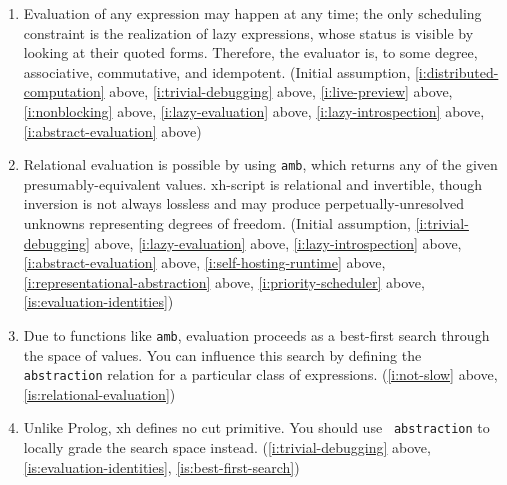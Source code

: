 \documentclass{report}
\begin{document}
\begin{enumerate}
\item{}\label{is:evaluation-identities}
  Evaluation of any expression may happen at any time; the only scheduling
  constraint is the realization of lazy expressions, whose status is
  visible by looking at their quoted forms. Therefore, the evaluator is, to
  some degree, associative, commutative, and idempotent.
    (Initial assumption,
     \ref{i:distributed-computation} above,
     \ref{i:trivial-debugging} above,
     \ref{i:live-preview} above,
     \ref{i:nonblocking} above,
     \ref{i:lazy-evaluation} above,
     \ref{i:lazy-introspection} above,
     \ref{i:abstract-evaluation} above)

\item{}\label{is:relational-evaluation}
  Relational evaluation is possible by using {\tt amb}, which returns any
  of the given presumably-equivalent values. xh-script is relational and
  invertible, though inversion is not always lossless and may produce
  perpetually-unresolved unknowns representing degrees of freedom.
    (Initial assumption,
     \ref{i:trivial-debugging} above,
     \ref{i:lazy-evaluation} above,
     \ref{i:lazy-introspection} above,
     \ref{i:abstract-evaluation} above,
     \ref{i:self-hosting-runtime} above,
     \ref{i:representational-abstraction} above,
     \ref{i:priority-scheduler} above,
     \ref{is:evaluation-identities})
\item{}\label{is:best-first-search}
  Due to functions like {\tt amb}, evaluation proceeds as a best-first
  search through the space of values. You can influence this search by
  defining the {\tt abstraction} relation for a particular class of
  expressions.
    (\ref{i:not-slow} above,
     \ref{is:relational-evaluation})
\item{}\label{is:no-cut-operator}
  Unlike Prolog, xh defines no cut primitive. You should use {\tt
  abstraction} to locally grade the search space instead.
    (\ref{i:trivial-debugging} above,
     \ref{is:evaluation-identities},
     \ref{is:best-first-search})


\end{enumerate}
\end{document}
